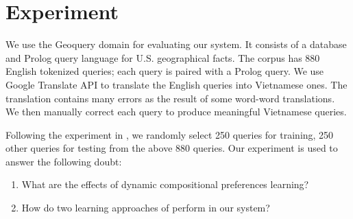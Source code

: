 \chapter{Experiment}
We use the Geoquery domain for evaluating our system. It consists of a database and Prolog query language for U.S. geographical facts. The corpus has 880 English tokenized queries; each query is paired with a Prolog query. We use Google Translate API to translate the English queries into Vietnamese ones. The translation contains many errors as the result of some word-word translations. We then manually correct each query to produce meaningful Vietnamese queries. 

Following the experiment in \cite{Clarke:2010:DSP:1870568.1870571}, we randomly select 250 queries for training, 250 other queries for testing from the above 880 queries. Our experiment is used to answer the following doubt:

\begin{enumerate}
  \item What are the effects of dynamic compositional preferences learning?
  \item How do two learning approaches of \cite{Clarke:2010:DSP:1870568.1870571} perform in our system?
\end{enumerate}


